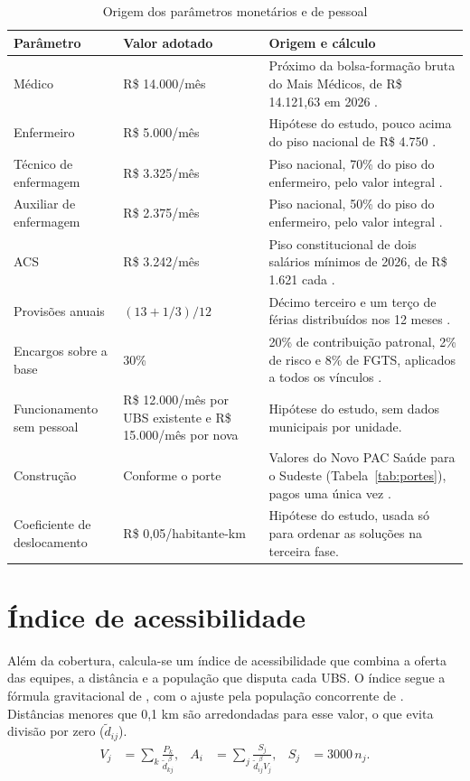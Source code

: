 \begin{table}[htbp]\centering
\caption{Origem dos parâmetros monetários e de pessoal}\label{tab:origem_custos}
\begin{tabular}{p{.26\linewidth}p{.23\linewidth}p{.40\linewidth}}
\toprule Parâmetro & Valor adotado & Origem e cálculo\\\midrule
Médico & R\$ 14.000/mês & Próximo da bolsa-formação bruta do Mais Médicos, de R\$ 14.121,63 em 2026 \citep{maismedicos2026}.\\
Enfermeiro & R\$ 5.000/mês & Hipótese do estudo, pouco acima do piso nacional de R\$ 4.750 \citep{brasil2022piso}.\\
Técnico de enfermagem & R\$ 3.325/mês & Piso nacional, 70\% do piso do enfermeiro, pelo valor integral \citep{brasil2022piso}.\\
Auxiliar de enfermagem & R\$ 2.375/mês & Piso nacional, 50\% do piso do enfermeiro, pelo valor integral \citep{brasil2022piso}.\\
ACS & R\$ 3.242/mês & Piso constitucional de dois salários mínimos de 2026, de R\$ 1.621 cada \citep{brasil2022,brasil2025sm}.\\
Provisões anuais & $(13+1/3)/12$ & Décimo terceiro e um terço de férias distribuídos nos 12 meses \citep{brasil1962decimo,brasil1988cf}.\\
Encargos sobre a base & 30\% & 20\% de contribuição patronal, 2\% de risco e 8\% de FGTS, aplicados a todos os vínculos \citep{brasil1991custeio,brasil1990fgts}.\\
Funcionamento sem pessoal & R\$ 12.000/mês por UBS existente e R\$ 15.000/mês por nova & Hipótese do estudo, sem dados municipais por unidade.\\
Construção & Conforme o porte & Valores do Novo PAC Saúde para o Sudeste (Tabela~\ref{tab:portes}), pagos uma única vez \citep{novopac2025}.\\
Coeficiente de deslocamento & R\$ 0,05/habitante-km & Hipótese do estudo, usada só para ordenar as soluções na terceira fase.\\
\bottomrule\end{tabular}
\end{table}

\section{Índice de acessibilidade}
Além da cobertura, calcula-se um índice de acessibilidade que combina a oferta das equipes, a distância
e a população que disputa cada UBS. O índice segue a fórmula gravitacional de \citet{hansen1959}, com o
ajuste pela população concorrente de \citet{joseph1982}. Distâncias menores que 0,1 km são arredondadas
para esse valor, o que evita divisão por zero ($\widetilde d_{ij}$).
\begin{align}
V_j&=\sum_k\frac{P_k}{\widetilde d_{kj}^{\,\beta}}, &
A_i&=\sum_j\frac{S_j}{\widetilde d_{ij}^{\,\beta}V_j}, &S_j&=3000\,n_j.
\end{align}

